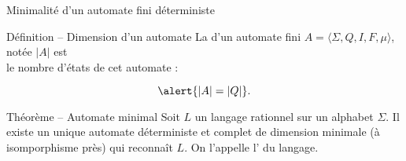
\begingroup

\begin{frame}{Minimalité d'un automate fini déterministe}
  \begin{block}{Définition -- Dimension d'un automate}
    La  d'un automate fini $A=\langle \Sigma, Q, I, F, \mu \rangle$,
    notée \alert{$|A|$} est \\ le nombre d'états de cet automate :

    $$\alert{|A| = |Q|}.$$
  \end{block}

  \begin{block}{Théorème -- Automate minimal}
    Soit $L$ un langage rationnel sur un alphabet $\Sigma$.
    Il existe \alert{un unique} automate déterministe et complet
    \alert{de dimension minimale} (à isomporphisme près) qui reconnaît $L$. 
    On l'appelle l’ du langage.
  \end{block}
\end{frame}

\endgroup
